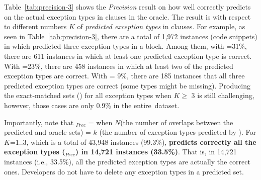 Table~\ref{tab:precision-3} shows the {\em Precision} result on how
well {\tool} correctly predicts on the actual exception types in
 clauses in the oracle. The result is with respect to
different numbers $K$ of {\em predicted exception types} in
 clauses. For example, as seen in
Table~\ref{tab:precision-3}, there are a total of 1,972 instances
(code snippets) in which {\tool} predicted three exception types in a
 block. Among them, with =31\%, there are
611 instances in which at least one predicted exception type is
correct. With =23\%, there are 458 instances in which at
least two of the predicted exception types are correct. With
 = 9\%, there are 185 instances that all three predicted
exception types are correct (some types might be missing).
Producing the exact-matched sets () for all exception
types when $K \ge$ 3 is still challenging, however, those cases are
only 0.9\% in the entire~dataset.

Importantly, note that $_{Prec}$ =  when
$N$(the number of overlaps between the predicted and oracle sets) =
$k$ (the number of exception types predicted by {\tool}).
For $K$=1..3, which is a total of 43,948 instances (99.3\%), {\bf
  {\tool} predicts correctly all the exception types
  ($_{Prec}$) in 14,721 instances (33.5\%)}. That is, in
14,721 instances (i.e., 33.5\%), all the predicted exception types are
actually the correct ones. Developers do not have to delete any
exception types in a predicted set.




